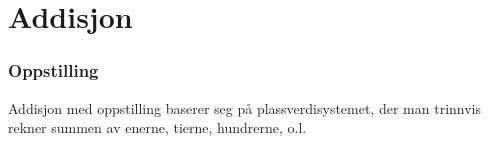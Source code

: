 



\section{Addisjon}

\subsubsection{Oppstilling}
Addisjon med oppstilling baserer seg på plassverdisystemet, der man trinnvis rekner summen av enerne, tierne, hundrerne, o.l.
\begin{center}
	\parbox{0.3\linewidth}{
}\qquad
\parbox{0.3\linewidth}{
}\\[12pt]
\parbox{0.3\linewidth}{
}\qquad
\parbox{0.3\linewidth}{
}
\end{center}
